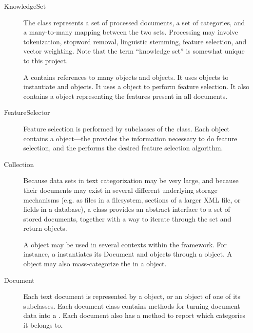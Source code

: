 \begin{description}

\item[KnowledgeSet]

The  class represents a set of processed documents, a set
of categories, and a many-to-many mapping between the two sets.
Processing may involve tokenization, stopword removal, linguistic
stemming, feature selection, and vector weighting.  Note that the term
``knowledge set'' is somewhat unique to this project.

A  contains references to many  objects and
 objects.  It uses  objects to instantiate 
and  objects.  It uses a  object to perform
feature selection.  It also contains a  object
representing the features present in all documents.

\item[FeatureSelector]

Feature selection is performed by subclasses of the 
class.  Each  object contains a 
object---the  provides the information necessary to do
feature selection, and the  performs the desired
feature selection algorithm.

\item[Collection]

Because data sets in text categorization may be very large, and
because their documents may exist in several different underlying
storage mechanisms (e.g. as files in a filesystem, sections of a
larger XML file, or fields in a database), a  class provides
an abstract interface to a set of stored documents, together with a
way to iterate through the set and return  objects.

A  object may be used in several contexts within the
framework.  For instance, a  instantiates its Document and
 objects through a  object.  A  object may
also mass-categorize the  in a  object.

\item[Document]

Each text document is represented by a  object, or an object
of one of its subclasses.  Each document class contains methods for
turning document data into a .  Each document also has
a method to report which categories it belongs to.


\end{description}
